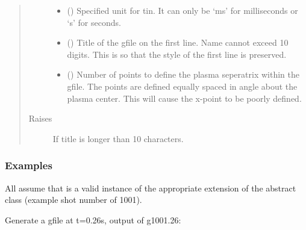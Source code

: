 \documentclass[letterpaper,10pt,english]{sphinxmanual}
\begin{document}
\begin{fulllineitems}
\begin{fulllineitems}
\begin{quote}
\begin{description}
\begin{itemize}
\item {} 
 () \textendash{} Specified unit for tin. It can only be ‘ms’ for
milliseconds or ‘s’ for seconds.

\item {} 
 () \textendash{} Title of the gfile on the first line. Name cannot
exceed 10 digits. This is so that the style of the first line
is preserved.

\item {} 
 () \textendash{} Number of points to define the plasma
seperatrix within the gfile.  The points are defined equally
spaced in angle about the plasma center.  This will cause the
x-point to be poorly defined.

\end{itemize}

\item[{Raises}] \leavevmode
{} \textendash{} If title is longer than 10 characters.

\end{description}\end{quote}
\subsubsection*{Examples}

All assume that  is a valid instance of the appropriate
extension of the {\hyperref[\detokenize{eqtools:eqtools.core.Equilibrium}]{}} abstract class (example
shot number of 1001).

Generate a gfile at t=0.26s, output of g1001.26:

\begin{sphinxVerbatim}[commandchars=\\\{\}]
\end{sphinxVerbatim}

\end{fulllineitems}



\end{fulllineitems}
\end{document}
